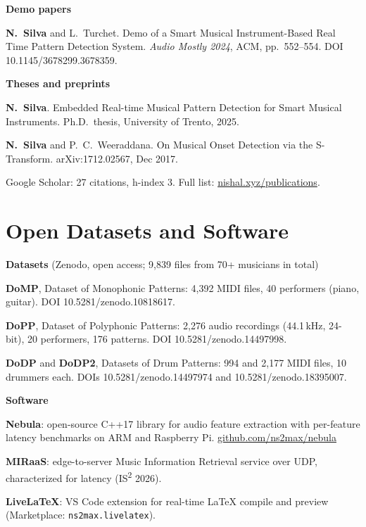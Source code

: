 \documentclass[11pt]{article}
\begin{document}
\textbf{Demo papers}
\begin{publist}[resume=pub]
  \item \textbf{N.\ Silva} and L.\ Turchet. Demo of a Smart Musical Instrument-Based Real Time Pattern Detection System. \textit{Audio Mostly 2024}, ACM, pp.\ 552--554. DOI 10.1145/3678299.3678359.
\end{publist}
\textbf{Theses and preprints}
\begin{publist}[resume=pub]
  \item \textbf{N.\ Silva}. Embedded Real-time Musical Pattern Detection for Smart Musical Instruments. Ph.D.\ thesis, University of Trento, 2025.
  \item \textbf{N.\ Silva} and P.\ C.\ Weeraddana. On Musical Onset Detection via the S-Transform. arXiv:1712.02567, Dec 2017.
\end{publist}
{\small Google Scholar: 27 citations, h-index 3. Full list: \href{https://nishal.xyz/publications}{nishal.xyz/publications}.}

\section*{Open Datasets and Software}
\textbf{Datasets} (Zenodo, open access; 9{,}839 files from 70+ musicians in total)
\begin{cvlist}
  \item \textbf{DoMP}, Dataset of Monophonic Patterns: 4{,}392 MIDI files, 40 performers (piano, guitar). DOI 10.5281/zenodo.10818617.
  \item \textbf{DoPP}, Dataset of Polyphonic Patterns: 2{,}276 audio recordings (44.1\,kHz, 24-bit), 20 performers, 176 patterns. DOI 10.5281/zenodo.14497998.
  \item \textbf{DoDP} and \textbf{DoDP2}, Datasets of Drum Patterns: 994 and 2{,}177 MIDI files, 10 drummers each. DOIs 10.5281/zenodo.14497974 and 10.5281/zenodo.18395007.
\end{cvlist}
\textbf{Software}
\begin{cvlist}
  \item \textbf{Nebula}: open-source C++17 library for audio feature extraction with per-feature latency benchmarks on ARM and Raspberry Pi. \href{https://github.com/ns2max/nebula}{github.com/ns2max/nebula}
  \item \textbf{MIRaaS}: edge-to-server Music Information Retrieval service over UDP, characterized for latency (IS\textsuperscript{2} 2026).
  \item \textbf{LiveLaTeX}: VS Code extension for real-time LaTeX compile and preview (Marketplace: \texttt{ns2max.livelatex}).
\end{cvlist}
\end{document}
